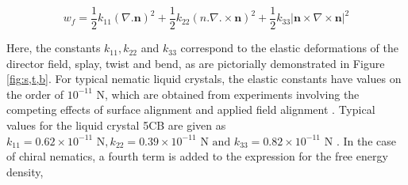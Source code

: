 \begin{equation}
w_f=\frac{1}{2}k_{11}\left(\nabla.\bm{n}\right)^2+\frac{1}{2}k_{22}\left(n.\nabla.\times\bm{n}\right)^2+\frac{1}{2}k_{33}\left|\bm{n}\times\nabla\times\bm{n}\right|^2
\label{eq:Free_energy}
\end{equation}

Here, the constants $k_{11},k_{22}$ and $k_{33}$ correspond to the elastic deformations of the director field, splay, twist and bend, as are pictorially demonstrated in Figure \ref{fig:s,t,b}. For typical nematic liquid crystals, the elastic constants have values on the order of $10^{-11}$ N, which are obtained from experiments involving the competing effects of surface alignment and applied field alignment \citep{Vertogen1988}. Typical values for the liquid crystal 5CB are given as $k_{11}=0.62\times10^{-11} \text{ N},k_{22}=0.39\times10^{-11} \text{ N}\text{ and }k_{33}=0.82\times10^{-11} \text{ N}$ \cite{Stewart2004}. In the case of chiral nematics, a fourth term is added to the expression for the free energy density,

